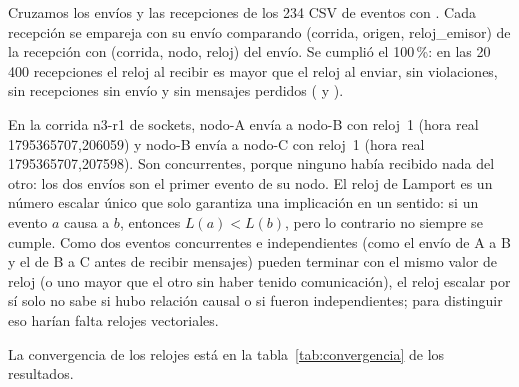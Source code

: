Cruzamos los envíos y las recepciones de los 234 CSV de eventos con . Cada recepción se empareja con su envío comparando (corrida, origen, reloj\_emisor) de la recepción con (corrida, nodo, reloj) del envío. Se cumplió el 100\,\%: en las 20\,400 recepciones el reloj al recibir es mayor que el reloj al enviar, sin violaciones, sin recepciones sin envío y sin mensajes perdidos ( y ).

En la corrida n3-r1 de sockets, nodo-A envía a nodo-B con reloj~1 (hora real 1795365707,206059) y nodo-B envía a nodo-C con reloj~1 (hora real 1795365707,207598). Son concurrentes, porque ninguno había recibido nada del otro: los dos envíos son el primer evento de su nodo. El reloj de Lamport es un número escalar único que solo garantiza una implicación en un sentido: si un evento $a$ causa a $b$, entonces $L(a) < L(b)$, pero lo contrario no siempre se cumple. Como dos eventos concurrentes e independientes (como el envío de A a B y el de B a C antes de recibir mensajes) pueden terminar con el mismo valor de reloj (o uno mayor que el otro sin haber tenido comunicación), el reloj escalar por sí solo no sabe si hubo relación causal o si fueron independientes; para distinguir eso harían falta relojes vectoriales.

La convergencia de los relojes está en la tabla~\ref{tab:convergencia} de los resultados.
